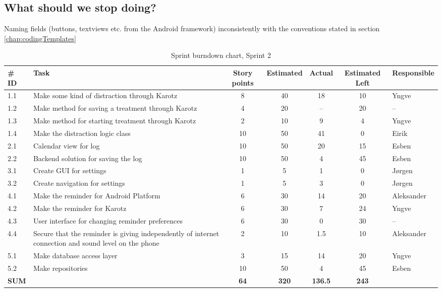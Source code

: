 \subsection*{What should we stop doing?}
Naming fields (buttons, textviews etc. from the Android framework) inconsistently
with the conventions stated in section \ref{chap:codingTemplates}

\begin{table}[t]
	\centering
	\begin{sideways}
		\begin{tabular}{|l | p{6.5cm} | c | c | c | c | l |}
			\hline
			  \#  ID 	& Task 	& Story points 	& Estimated & Actual &
			  Estimated Left & Responsible \\
			\hline
			  1.1 & Make some kind of distraction through Karotz 		& 8  	& 40	&  18 & 10
			  & Yngve
			  \\
			\hline
			  1.2 & Make method for saving a treatment through Karotz  	& 4  	& 20 & -- & 20 &
			  --
			  \\
			\hline
			  1.3 & Make method for starting treatment through Karotz 	& 2	&   	10	& 9 & 4 &
			  Yngve \\
			\hline
			  1.4 & Make the distraction logic class 							& 10  & 50 & 41 & 0 & Eirik \\
			\hline
			  2.1 & Calendar view for log & 10 & 50 & 20 & 15 &  Esben \\
			\hline
			2.2 & Backend solution for saving the log & 10 & 50 & 4 & 45 & Esben \\
			\hline
			3.1 & Create GUI for settings & 1 & 5 & 1 & 0 & Jørgen  \\
			\hline
			3.2 & Create navigation for settings & 1 & 5 & 3 & 0 & Jørgen  \\
			\hline
			4.1 & Make the reminder for Android Platform & 6 & 30 & 14 & 20 & Aleksander \\
			\hline
			4.2 & Make the reminder for Karotz & 6 & 30 & 7 & 24 & Yngve \\
			\hline
			4.3 & User interface for changing reminder preferences & 6 & 30 & 0 & 30 & -- \\
			\hline
			4.4 & Secure that the reminder is giving independently of internet connection and sound level on the phone
			 & 2 & 10 & 1.5 & 10 & Aleksander \\
			\hline
			5.1 & Make database access layer & 3 & 15 & 14 & 20 & Yngve \\
			\hline
			5.2 & Make repositories & 10 & 50 & 4 & 45 & Esben \\
			\hline
			\bfseries{SUM} & & \bfseries{64} & \bfseries{320} & \bfseries{136.5} & \bfseries{243} & \\
			\hline
			\hline
		\end{tabular}
	\end{sideways}
	\caption{Sprint burndown chart, Sprint 2}
	\label{tab:sprint2burndown}
\end{table}

